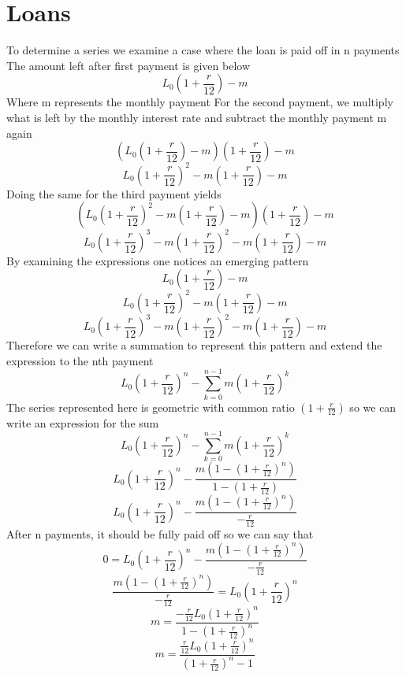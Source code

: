 \documentclass{article}
\begin{document}
\section*{Loans}
To determine a series we examine a case where the loan is paid off in n payments\newline
The amount left after first payment is given below
$$L_0(1+\frac{r}{12})-m$$
Where m represents the monthly payment\newline
For the second payment, we multiply what is left by the monthly interest rate and subtract the monthly payment m again
$$(L_0(1+\frac{r}{12})-m)(1+\frac{r}{12})-m $$
$$L_0(1+\frac{r}{12})^2-m(1+\frac{r}{12})-m $$
Doing the same for the third payment yields
$$(L_0(1+\frac{r}{12})^2-m(1+\frac{r}{12})-m)(1+\frac{r}{12})-m $$
$$L_0(1+\frac{r}{12})^3-m(1+\frac{r}{12})^2-m(1+\frac{r}{12})-m $$
By examining the expressions one notices an emerging pattern
$$L_0(1+\frac{r}{12})-m$$
$$L_0(1+\frac{r}{12})^2-m(1+\frac{r}{12})-m $$
$$L_0(1+\frac{r}{12})^3-m(1+\frac{r}{12})^2-m(1+\frac{r}{12})-m $$
Therefore we can write a summation to represent this pattern and extend the expression to the nth payment
$$L_0(1+\frac{r}{12})^n- \sum_{k=0}^{n-1} m(1+\frac{r}{12})^k $$
The series represented here is geometric with common ratio $(1+\frac{r}{12})$ so we can write an expression for the sum
$$L_0(1+\frac{r}{12})^n- \sum_{k=0}^{n-1} m(1+\frac{r}{12})^k $$
$$L_0(1+\frac{r}{12})^n- \frac{m(1-(1+\frac{r}{12})^{n})}{1-(1+\frac{r}{12})}$$
$$L_0(1+\frac{r}{12})^n- \frac{m(1-(1+\frac{r}{12})^{n})}{-\frac{r}{12}}$$
After n payments, it should be fully paid off so we can say that
$$0=L_0(1+\frac{r}{12})^n- \frac{m(1-(1+\frac{r}{12})^{n})}{-\frac{r}{12}}$$
$$\frac{m(1-(1+\frac{r}{12})^{n})}{-\frac{r}{12}}=L_0(1+\frac{r}{12})^n$$
$$m=\frac{-\frac{r}{12}L_0(1+\frac{r}{12})^n}{{1-(1+\frac{r}{12})^{n}}}$$
$$m=\frac{\frac{r}{12}L_0(1+\frac{r}{12})^n}{{(1+\frac{r}{12})^{n}-1}}$$
\end{document}
